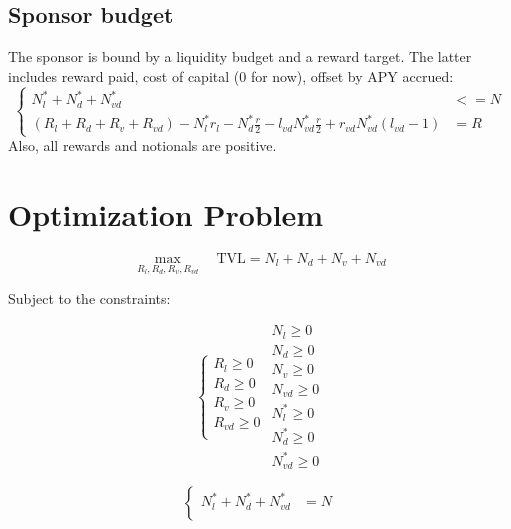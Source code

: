 \documentclass{article}
\begin{document}
\subsection{Sponsor budget}

The sponsor is bound by a liquidity budget and a reward target.
The latter includes reward paid, cost of capital (0 for now), offset by APY accrued:
\begin{equation}
    \left\{
    \begin{aligned}
    N_l^* + N_d^* + N_{vd}^* &<= N\\
    (R_l+R_d+R_v+R_{vd}) - N_l^* r_l - N_d^* \frac{r}{2} 
    - l_{vd} N_{vd}^* \frac{r}{2} + r_{vd} N_{vd}^* (l_{vd}-1) &= R
    \end{aligned}
    \right.
\end{equation}
Also, all rewards and notionals are positive.

\section{Optimization Problem}

\begin{equation}
    \max_{R_l, R_d, R_v, R_{vd}} \quad \text{TVL} = N_l + N_d + N_v + N_{vd}
\end{equation}

Subject to the constraints:

\begin{equation}
    \left\{
    \begin{aligned}
    R_l \geq 0 \\
    R_d \geq 0 \\
    R_v \geq 0 \\
    R_{vd} \geq 0 \\
    \end{aligned}
    \right.
    \begin{aligned}
    N_l \geq 0 \\
    N_d \geq 0 \\
    N_v \geq 0 \\
    N_{vd} \geq 0 \\
    N_l^* \geq 0 \\
    N_d^* \geq 0 \\
    N_{vd}^* \geq 0
    \end{aligned}
\end{equation}

\begin{equation}
    \left\{
    \begin{aligned}
    N_l^* + N_d^* + N_{vd}^* &= N \\
    \end{aligned}
    \right.
\end{equation}
\end{document}
